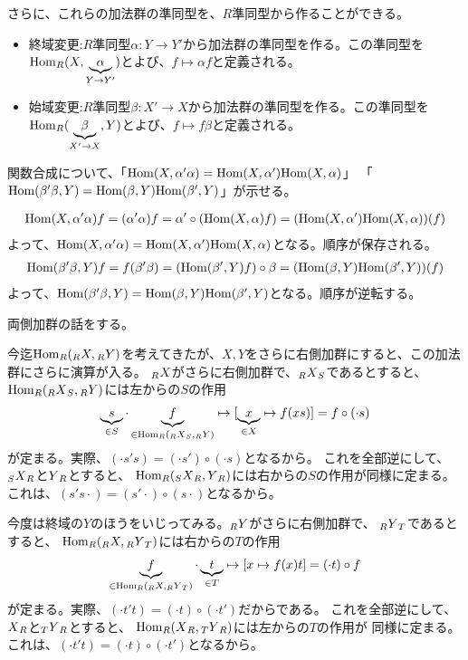 \documentclass[9pt]{ltjsarticle}
\begin{document}
さらに、これらの加法群の準同型を、$R$準同型から作ることができる。
\begin{itemize}
  \item 終域変更:$R$準同型$\alpha\colon Y\to Y'$から加法群の準同型を作る。この準同型を$\Hom_R(X,\ub{\alpha}_{Y \to Y'})$とよび、$f \mapsto \alpha f$と定義される。
  \item 始域変更:$R$準同型$\beta\colon X' \to X$から加法群の準同型を作る。この準同型を$\Hom_R(\ub{\beta}_{X'\to X},Y)$とよび、$f\mapsto f\beta$と定義される。
\end{itemize}
関数合成について、「$\Hom(X,\alpha' \alpha)=\Hom(X,\alpha')\Hom(X,\alpha)$」
「$\Hom(\beta'\beta, Y) = \Hom(\beta,Y)\Hom(\beta',Y)$」が示せる。
\begin{myproof}
  \begin{align}
    \Hom(X,\alpha'\alpha)f
    =
    (\alpha'\alpha)f
    =
    \alpha' \circ ( \Hom(X,\alpha)f)
    =
    (\Hom(X,\alpha')\Hom(X,\alpha))(f)
  \end{align}
  よって、$\Hom(X,\alpha'\alpha)=\Hom(X,\alpha')\Hom(X,\alpha)$となる。順序が保存される。
  \begin{align}
    \Hom(\beta'\beta,Y)f
    =
    f(\beta'\beta)
    =
    (\Hom(\beta',Y)f)\circ \beta
    =
    (\Hom(\beta,Y)\Hom(\beta',Y))(f)
  \end{align}
  よって、$\Hom(\beta'\beta,Y)=\Hom(\beta,Y)\Hom(\beta',Y)$となる。順序が逆転する。
\end{myproof}

両側加群の話をする。

今迄$\Hom_R(\Lmod{R}X,\Lmod{R}Y)$を考えてきたが、$X,Y$をさらに右側加群にすると、この加法群にさらに演算が入る。
$\Lmod{R}X$がさらに右側加群で、$\Lmod{R}\Rmod{S}X$であるとすると、
$\Hom_R(\Lmod{R}\Rmod{S}X,\Lmod{R}Y)$には左からの$S$の作用
\begin{align}
  \ub{s}_{\in S}\cdot \ub{f}_{\in \Hom_R(\Lmod{R}\Rmod{S}X,\Lmod{R}Y)} \mapsto [\ub{x}_{\in X}\mapsto f(xs)] = f\circ (\cdot s)
\end{align}
が定まる。実際、$(\cdot s's) = (\cdot s')\circ (\cdot s)$となるから。
これを全部逆にして、$\Lmod{S}\Rmod{R}X$と$\Rmod{R}Y$とすると、
$\Hom_R(\Lmod{S}\Rmod{R}X,\Rmod{R}Y)$には右からの$S$の作用が同様に定まる。これは、$(s's\cdot) = (s'\cdot)\circ (s\cdot)$となるから。

今度は終域の$Y$のほうをいじってみる。$\Lmod{R}Y$がさらに右側加群で、
$\Lmod{R}\Rmod{T}Y$であるとすると、
$\Hom_R(\Lmod{R}X,\Lmod{R}\Rmod{T}Y)$には右からの$T$の作用
\begin{align}
  \ub{f}_{\in \Hom_R(\Lmod{R}X,\Lmod{R}\Rmod{T}Y)} \cdot \ub{t}_{\in T}
  \mapsto
  [x\mapsto f(x)t] = (\cdot t)\circ f
\end{align}
が定まる。実際、$(\cdot t' t) = (\cdot t)\circ (\cdot t')$だからである。
これを全部逆にして、$\Rmod{R}X$と$\Lmod{T}\Rmod{R}Y$とすると、
$\Hom_R(\Rmod{R}X,\Lmod{T}\Rmod{R}Y)$には左からの$T$の作用が
同様に定まる。これは、$(\cdot t't) = (\cdot t)\circ (\cdot t')$となるから。
\end{document}
